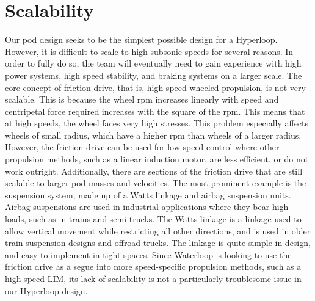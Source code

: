 \documentclass[main.tex]{subfiles}
\begin{document}
\section{Scalability}
Our pod design seeks to be the simplest possible design for a Hyperloop. However, it is difficult to scale to high-subsonic speeds for several reasons.
In order to fully do so, the team will eventually need to gain experience with high power systems, high speed stability, and braking systems on a larger scale. The core concept of friction drive, that is, high-speed wheeled propulsion, is not very scalable. This is because the wheel rpm increases linearly with speed and centripetal force required increases with the square of the rpm. This means that at high speeds, the wheel faces very high stresses. This problem especially affects wheels of small radius, which have a higher rpm than wheels of a larger radius. However, the friction drive can be used for low speed control where other propulsion methods, such as a linear induction motor, are less efficient, or do not work outright. Additionally, there are sections of the friction drive that are still scalable to larger pod masses and velocities. The most prominent example is the suspension system, made up of a Watts linkage and airbag suspension units. Airbag suspensions are used in industrial applications where they bear high loads, such as in trains and semi trucks. The Watts linkage is a linkage used to allow vertical movement while restricting all other directions, and is used in older train suspension designs and offroad trucks. The linkage is quite simple in design, and easy to implement in tight spaces. Since Waterloop is looking to use the friction drive as a segue into more speed-specific propulsion methods, such as a high speed LIM, its lack of scalability is not a particularly troublesome issue in our Hyperloop design.\\
\end{document}
